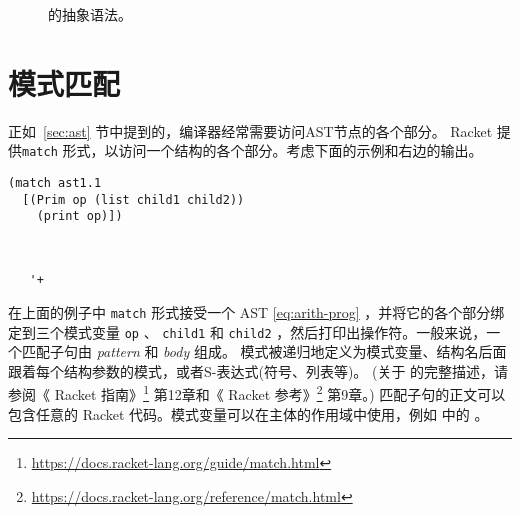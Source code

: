 \documentclass[11pt]{book}
\begin{document}
\begin{figure}[tp]
\caption{\LangInt{} 的抽象语法。}
\label{fig:r0-syntax}
\end{figure}


\section{模式匹配}
\label{sec:pattern-matching}

正如~\ref{sec:ast} 节中提到的，编译器经常需要访问AST节点的各个部分。 Racket 提供\texttt{match} 形式，以访问一个结构的各个部分。考虑下面的示例和右边的输出。  
\begin{center}
\begin{minipage}{0.5\textwidth}
\begin{lstlisting}
(match ast1.1
  [(Prim op (list child1 child2))
    (print op)])
\end{lstlisting}
\end{minipage}
\vrule
\begin{minipage}{0.25\textwidth}
\begin{lstlisting}


   '+
\end{lstlisting}
\end{minipage}
\end{center}
在上面的例子中 \texttt{match} 形式接受一个 AST
\eqref{eq:arith-prog} ，并将它的各个部分绑定到三个模式变量 \texttt{op} 、 \texttt{child1} 和 \texttt{child2} ，然后打印出操作符。一般来说，一个匹配子句由
\emph{pattern} 和 \emph{body} 组成。 模式被递归地定义为模式变量、结构名后面跟着每个结构参数的模式，或者S-表达式(符号、列表等)。 (关于  的完整描述，请参阅《 Racket 指南》\footnote{\url{https://docs.racket-lang.org/guide/match.html}} 
第12章和《 Racket 参考》\footnote{\url{https://docs.racket-lang.org/reference/match.html}}
第9章。)
%
匹配子句的正文可以包含任意的 Racket 代码。模式变量可以在主体的作用域中使用，例如
  中的 。
\end{document}
